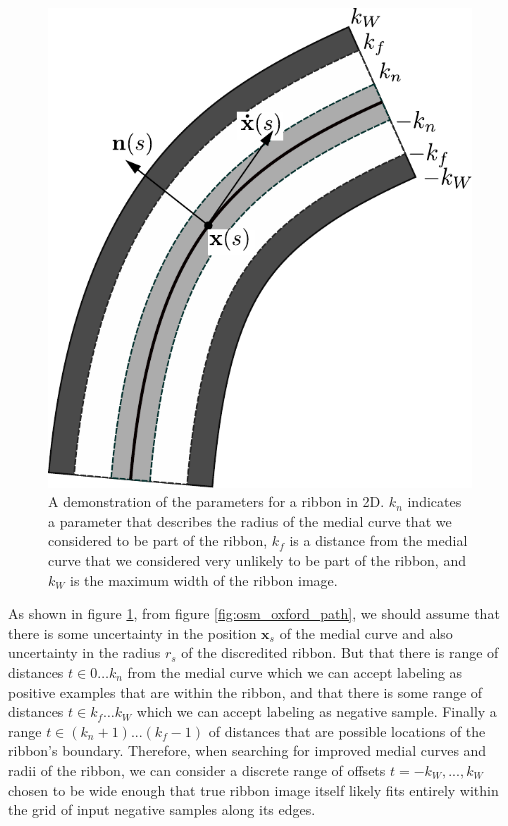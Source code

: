 \begin{figure}[H]
    \centering
    \includegraphics[width=\textwidth]{Figures/sw-figure.pdf}
    \caption[2D Ribbon Image]{A demonstration of the parameters for a ribbon in 2D. $k_n$ indicates a parameter that describes the radius of the medial curve that we considered to be part of the ribbon, $k_f$ is a distance from the medial curve that we considered very unlikely to be part of the ribbon, and $k_W$ is the maximum width of the ribbon image.}
    \label{fig:2d_ribbon}
\end{figure}

As shown in figure \ref{fig:2d_ribbon}, from figure \ref{fig:osm_oxford_path}, we should assume that there is some uncertainty in the position $\mathbf{x}_s$ of the medial curve and also uncertainty in the radius $r_s$ of the discredited ribbon. 
But that there is range of distances $t \in 0\dots k_n$ from the medial curve which we can accept labeling as positive examples that are within the ribbon, and that there is some range of distances $t \in k_f\dots k_W$ which we can accept labeling as negative sample. 
Finally a range $t\in (k_n+1)...(k_f-1)$ of distances that are possible locations of the ribbon's boundary.
Therefore, when searching for improved medial curves and radii of the ribbon, we can consider a discrete range of offsets $t=-k_W,..., k_W$ chosen to be wide enough that true ribbon image itself likely fits entirely within the grid of input negative samples along its edges.  

